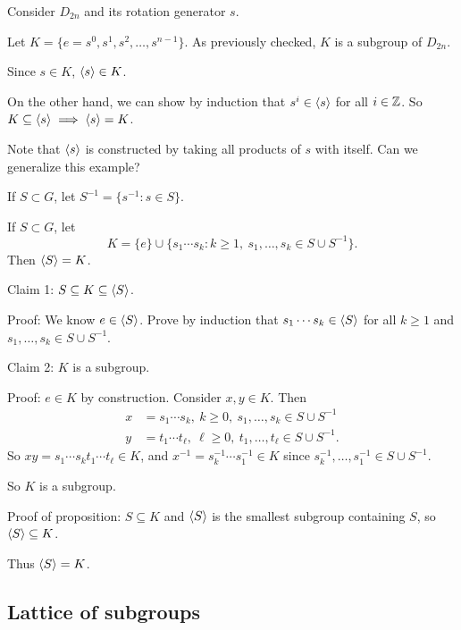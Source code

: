 \documentclass[12pt,letterpaper]{report}
\begin{document}
\begin{ex}
  Consider $D_{2n}$ and its rotation generator $s$.

  Let $K = \{e = s^0, s^1, s^2, \ldots, s^{n - 1}\}$.
  As previously checked, $K$ is a subgroup of $D_{2n}$.

  Since $s \in K$, $\langle s\rangle \in K$.

  On the other hand, we can show by induction that $s^i \in \langle s\rangle$ for all
  $i \in \mathbb{Z}$.
  So $K \subseteq \langle s\rangle \implies \langle s\rangle = K$.
\end{ex}

Note that $\langle s\rangle$ is constructed by taking all products of $s$ with itself.
Can we generalize this example?

If $S \subset G$, let $S^{-1} = \{s^{-1} : s \in S\}$.

\begin{prop}{}{}
  If $S \subset G$, let
  \[ K = \{e\} \cup \{ s_1 \cdots s_k : k \geq 1, \ s_1, \ldots, s_k \in S \cup S^{-1} \}. \]
  Then $\langle S\rangle = K$.
\end{prop}

\begin{thmproof}
  Claim 1: $S \subseteq K \subseteq \langle S\rangle$.

  Proof: We know $e \in \langle S\rangle$.
  Prove by induction that $s_1 \cdots s_k \in \langle S\rangle$ for all $k \geq 1$ and
  $s_1, \ldots, s_k \in S \cup S^{-1}$.

  Claim 2: $K$ is a subgroup.

  Proof: $e \in K$ by construction.
  Consider $x, y \in K$.
  Then
  \begin{align*}
    x &= s_1 \cdots s_k, \ k \geq 0, \ s_1, \ldots, s_k \in S \cup S^{-1} \\
    y &= t_1 \cdots t_\ell, \ \ell \geq 0, \ t_1, \ldots, t_\ell \in S \cup S^{-1}.
  \end{align*}
  So $xy = s_1 \cdots s_k t_1 \cdots t_\ell \in K$, and $x^{-1} = s_k^{-1} \cdots s_1^{-1} \in K$
  since $s_k^{-1}, \ldots, s_1^{-1} \in S \cup S^{-1}$.

  So $K$ is a subgroup.

  Proof of proposition: $S \subseteq K$ and $\langle S\rangle$ is the smallest subgroup containing
  $S$, so $\langle S\rangle \subseteq K$.

  Thus $\langle S\rangle = K$.
\end{thmproof}

\pagebreak
\subsection{Lattice of subgroups}
\end{document}
